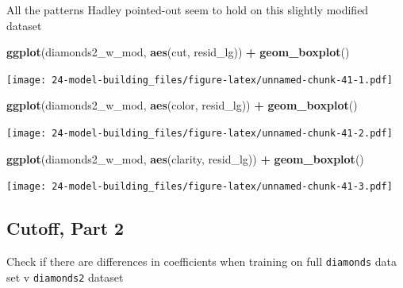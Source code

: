 \documentclass[]{book}
\newenvironment{Shaded}{\begin{snugshade}}{\end{snugshade}}
\newcommand{\KeywordTok}[1]{\textcolor[rgb]{0.13,0.29,0.53}{\textbf{#1}}}
\newcommand{\NormalTok}[1]{#1}
\newcommand{\OperatorTok}[1]{\textcolor[rgb]{0.81,0.36,0.00}{\textbf{#1}}}
\newcommand{\StringTok}[1]{\textcolor[rgb]{0.31,0.60,0.02}{#1}}
\theoremstyle{definition}
\theoremstyle{definition}
\theoremstyle{definition}
\theoremstyle{remark}
\begin{document}
All the patterns Hadley pointed-out seem to hold on this slightly
modified dataset

\begin{Shaded}
\begin{Highlighting}[]
\KeywordTok{ggplot}\NormalTok{(diamonds2_w_mod, }\KeywordTok{aes}\NormalTok{(cut, resid_lg)) }\OperatorTok{+}\StringTok{ }\KeywordTok{geom_boxplot}\NormalTok{()}
\end{Highlighting}
\end{Shaded}

\texttt{[image: 24-model-building\_files/figure-latex/unnamed-chunk-41-1.pdf]}

\begin{Shaded}
\begin{Highlighting}[]
\KeywordTok{ggplot}\NormalTok{(diamonds2_w_mod, }\KeywordTok{aes}\NormalTok{(color, resid_lg)) }\OperatorTok{+}\StringTok{ }\KeywordTok{geom_boxplot}\NormalTok{()}
\end{Highlighting}
\end{Shaded}

\texttt{[image: 24-model-building\_files/figure-latex/unnamed-chunk-41-2.pdf]}

\begin{Shaded}
\begin{Highlighting}[]
\KeywordTok{ggplot}\NormalTok{(diamonds2_w_mod, }\KeywordTok{aes}\NormalTok{(clarity, resid_lg)) }\OperatorTok{+}\StringTok{ }\KeywordTok{geom_boxplot}\NormalTok{()}
\end{Highlighting}
\end{Shaded}

\texttt{[image: 24-model-building\_files/figure-latex/unnamed-chunk-41-3.pdf]}

\hypertarget{cutoff-part-2}{%
\subsection{Cutoff, Part 2}\label{cutoff-part-2}}

Check if there are differences in coefficients when training on full
\texttt{diamonds} data set v \texttt{diamonds2} dataset
\end{document}
